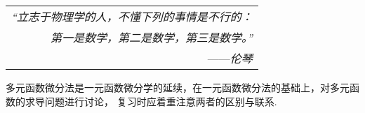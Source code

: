 \begin{flushright}
    \begin{tabular}{r|}
        \textit{“立志于物理学的人，不懂下列的事情是不行的：}\\
        \textit{第一是数学，第二是数学，第三是数学。”}\\
        ——\textit{伦琴}
    \end{tabular}
\end{flushright}

多元函数微分法是一元函数微分学的延续，在一元函数微分法的基础上，对多元函数的求导问题进行讨论，
复习时应着重注意两者的区别与联系.